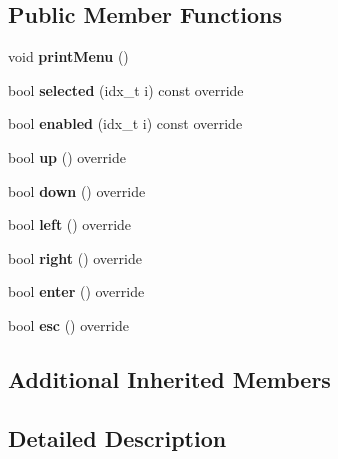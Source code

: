\subsection*{Public Member Functions}
\begin{DoxyCompactItemize}
\item 
\mbox{\label{classDynamicNav_a25fc31774efe41488da85911226dedba}} 
void {\bfseries print\+Menu} ()
\item 
\mbox{\label{classDynamicNav_ab83b1dcee3497f8ac1dcf79645d5eda6}} 
bool {\bfseries selected} (idx\+\_\+t i) const override
\item 
\mbox{\label{classDynamicNav_a936bedd336e917789c666b6a8dbda6e2}} 
bool {\bfseries enabled} (idx\+\_\+t i) const override
\item 
\mbox{\label{classDynamicNav_a311f6301899fe8022d1188a41b6d3a3d}} 
bool {\bfseries up} () override
\item 
\mbox{\label{classDynamicNav_af29357e2328551fb6d68b5d0652c5cbb}} 
bool {\bfseries down} () override
\item 
\mbox{\label{classDynamicNav_a056c94a768614ce2290ced9030868c75}} 
bool {\bfseries left} () override
\item 
\mbox{\label{classDynamicNav_a866d57846795b913329ee39fd670d942}} 
bool {\bfseries right} () override
\item 
\mbox{\label{classDynamicNav_a1781e521f7d4e267f5e401c6070667b6}} 
bool {\bfseries enter} () override
\item 
\mbox{\label{classDynamicNav_abfa730037c5dd6f8902d5f76bba9121b}} 
bool {\bfseries esc} () override
\end{DoxyCompactItemize}
\subsection*{Additional Inherited Members}


\subsection{Detailed Description}
